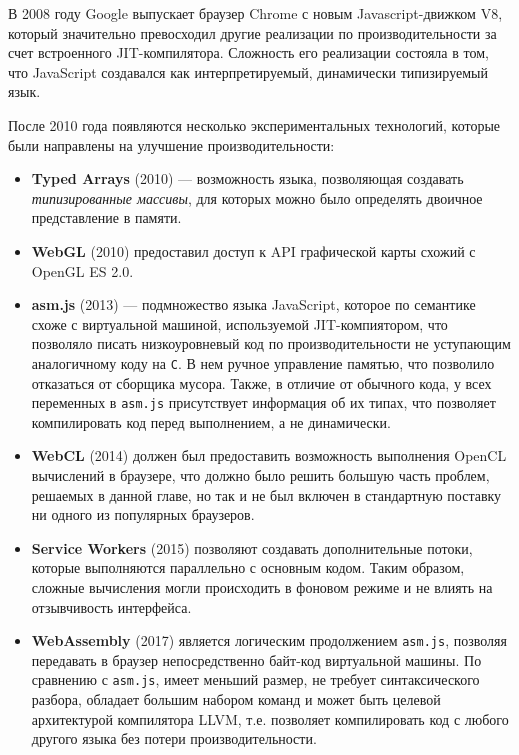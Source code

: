 В 2008 году Google выпускает браузер Chrome с новым Javascript-движком V8, который значительно превосходил другие реализации по производительности за счет встроенного JIT-компилятора. Сложность его реализации состояла в том, что JavaScript создавался как интерпретируемый, динамически типизируемый язык.

После 2010 года появляются несколько экспериментальных технологий, которые были направлены на улучшение производительности:

\begin{itemize}
\item {\bfseries Typed Arrays} (2010) --- возможность языка, позволяющая создавать {\itshape типизированные массивы}, для которых можно было определять двоичное представление в памяти.
\item {\bfseries WebGL} (2010) предоставил доступ к API графической карты схожий с OpenGL ES 2.0.
\item {\bfseries asm.js} (2013) --- подмножество языка JavaScript, которое по семантике схоже с виртуальной машиной, используемой JIT-компиятором, что позволяло писать низкоуровневый код по производительности не уступающим аналогичному коду на \texttt{C}. В нем ручное управление памятью, что позволило отказаться от сборщика мусора. Также, в отличие от обычного кода, у всех переменных в \texttt{asm.js} присутствует информация об их типах, что позволяет компилировать код перед выполнением, а не динамически.
\item {\bfseries WebCL} (2014) должен был предоставить возможность выполнения OpenCL вычислений в браузере, что должно было решить большую часть проблем, решаемых в данной главе, но так и не был включен в стандартную поставку ни одного из популярных браузеров.
\item {\bfseries Service Workers} (2015) позволяют создавать дополнительные потоки, которые выполняются параллельно с основным кодом. Таким образом, сложные вычисления могли происходить в фоновом режиме и не влиять на отзывчивость интерфейса.
\item {\bfseries WebAssembly} (2017) является логическим продолжением \texttt{asm.js}, позволяя передавать в браузер непосредственно байт-код виртуальной машины. По сравнению с \texttt{asm.js}, имеет меньший размер, не требует синтаксического разбора, обладает большим набором команд и может быть целевой архитектурой компилятора LLVM, т.е. позволяет компилировать код с любого другого языка без потери производительности.
\end{itemize}

